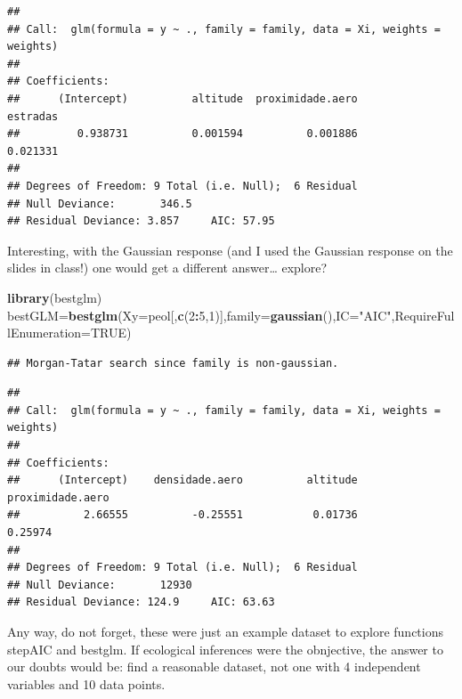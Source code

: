 \documentclass[
]{book}
\newenvironment{Shaded}{\begin{snugshade}}{\end{snugshade}}
\newcommand{\DataTypeTok}[1]{\textcolor[rgb]{0.13,0.29,0.53}{#1}}
\newcommand{\DecValTok}[1]{\textcolor[rgb]{0.00,0.00,0.81}{#1}}
\newcommand{\KeywordTok}[1]{\textcolor[rgb]{0.13,0.29,0.53}{\textbf{#1}}}
\newcommand{\NormalTok}[1]{#1}
\newcommand{\OperatorTok}[1]{\textcolor[rgb]{0.81,0.36,0.00}{\textbf{#1}}}
\newcommand{\OtherTok}[1]{\textcolor[rgb]{0.56,0.35,0.01}{#1}}
\newcommand{\StringTok}[1]{\textcolor[rgb]{0.31,0.60,0.02}{#1}}
\begin{document}
\begin{verbatim}
## 
## Call:  glm(formula = y ~ ., family = family, data = Xi, weights = weights)
## 
## Coefficients:
##      (Intercept)          altitude  proximidade.aero          estradas  
##         0.938731          0.001594          0.001886          0.021331  
## 
## Degrees of Freedom: 9 Total (i.e. Null);  6 Residual
## Null Deviance:	    346.5 
## Residual Deviance: 3.857 	AIC: 57.95
\end{verbatim}

Interesting, with the Gaussian response (and I used the Gaussian response on the slides in class!) one would get a different answer\ldots{} explore?

\begin{Shaded}
\begin{Highlighting}[]
\KeywordTok{library}\NormalTok{(bestglm)}
\NormalTok{bestGLM=}\KeywordTok{bestglm}\NormalTok{(}\DataTypeTok{Xy=}\NormalTok{peol[,}\KeywordTok{c}\NormalTok{(}\DecValTok{2}\OperatorTok{:}\DecValTok{5}\NormalTok{,}\DecValTok{1}\NormalTok{)],}\DataTypeTok{family=}\KeywordTok{gaussian}\NormalTok{(),}\DataTypeTok{IC=}\StringTok{"AIC"}\NormalTok{,}\DataTypeTok{RequireFullEnumeration=}\OtherTok{TRUE}\NormalTok{)}
\end{Highlighting}
\end{Shaded}

\begin{verbatim}
## Morgan-Tatar search since family is non-gaussian.
\end{verbatim}

\begin{Shaded}
\end{Shaded}

\begin{verbatim}
## 
## Call:  glm(formula = y ~ ., family = family, data = Xi, weights = weights)
## 
## Coefficients:
##      (Intercept)    densidade.aero          altitude  proximidade.aero  
##          2.66555          -0.25551           0.01736           0.25974  
## 
## Degrees of Freedom: 9 Total (i.e. Null);  6 Residual
## Null Deviance:	    12930 
## Residual Deviance: 124.9 	AIC: 63.63
\end{verbatim}

Any way, do not forget, these were just an example dataset to explore functions stepAIC and bestglm. If ecological inferences were the obnjective, the answer to our doubts would be: find a reasonable dataset, not one with 4 independent variables and 10 data points.
\end{document}

